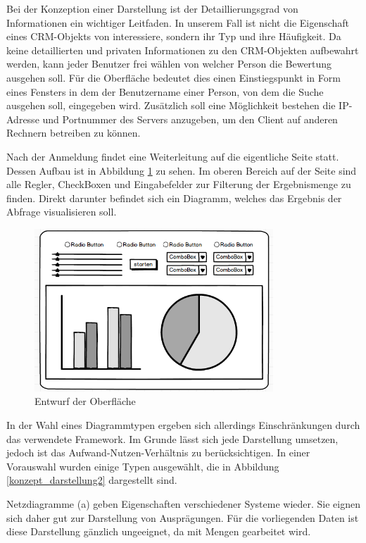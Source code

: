 Bei der Konzeption einer Darstellung ist der Detaillierungsgrad von Informationen ein wichtiger Leitfaden. In unserem Fall ist nicht die Eigenschaft eines CRM-Objekts von interessiere, sondern ihr Typ und ihre Häufigkeit. Da keine detaillierten und privaten Informationen zu den CRM-Objekten aufbewahrt werden, kann jeder Benutzer frei wählen von welcher Person die Bewertung ausgehen  soll. Für die Oberfläche bedeutet dies einen Einstiegspunkt in Form eines Fensters in dem der Benutzername einer Person, von dem die Suche ausgehen soll, eingegeben wird. Zusätzlich soll eine Möglichkeit bestehen die IP-Adresse und Portnummer des Servers anzugeben, um den Client auf anderen Rechnern betreiben zu können.

Nach der Anmeldung findet eine Weiterleitung auf die eigentliche Seite statt. Dessen Aufbau ist in Abbildung \ref{konzept_darstellung} zu sehen. Im oberen Bereich auf der Seite sind alle Regler, CheckBoxen und Eingabefelder zur Filterung der Ergebnismenge zu finden. Direkt darunter befindet sich ein Diagramm, welches das Ergebnis der Abfrage visualisieren soll.

\begin{figure}[htbp]
\centering
  \includegraphics[width=0.8\textwidth, width=0.8\textwidth]{pics/mockup.png}
\caption{Entwurf der Oberfläche}
\label{konzept_darstellung}
\end{figure} 

In der Wahl eines Diagrammtypen ergeben sich allerdings Einschränkungen durch das verwendete Framework. Im Grunde lässt sich jede Darstellung umsetzen, jedoch ist das Aufwand-Nutzen-Verhältnis zu berücksichtigen. In einer Vorauswahl wurden einige  Typen ausgewählt, die in Abbildung \ref{konzept_darstellung2} dargestellt sind. 

Netzdiagramme (a) geben Eigenschaften verschiedener Systeme wieder. Sie eignen sich daher gut zur Darstellung von Ausprägungen. Für die vorliegenden Daten ist diese Darstellung gänzlich ungeeignet, da mit Mengen gearbeitet wird. 

